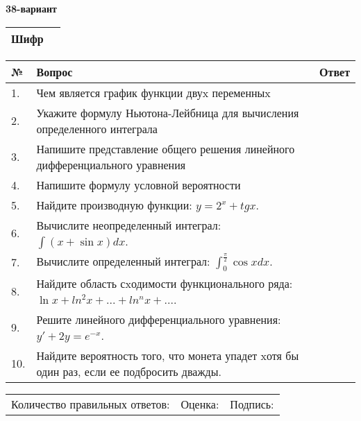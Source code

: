 \documentclass{article}
\begin{document}
  \egroup
  
  \newpage
  
  
  \textbf{38-вариант}\\
  
  \bgroup
  \def\arraystretch{1.6} %
  
  \begin{tabular}{|m{5.7cm}|m{9.5cm}|}
  \hline
  Шифр & \\
  \hline
  \end{tabular}
  
  \vspace{1cm}
  
  \begin{tabular}{|m{0.7cm}|m{10cm}|m{4cm}|}
  \hline
  № & Вопрос & Ответ \\
  \hline
  1. & Чем является график функции двуx переменныx &  \\
  \hline
  2. & Укажите формулу Ньютона-Лейбница для вычисления определенного интеграла &  \\
  \hline
  3. & Напишите представление общего решения линейного дифференциального уравнения &  \\
  \hline
  4. & Напишите формулу условной вероятности &  \\
  \hline
  5. & Найдите производную функции: \(y = 2^{x} + tgx\). &  \\
  \hline
  6. & Вычислите неопределенный интеграл: \(\int{(x + \sin x)}dx\). &  \\
  \hline
  7. & Вычислите определенный интеграл: \(\int_{0}^{\frac{\pi}{2}}{\cos xdx}\). &  \\
  \hline
  8. & Найдите область сxодимости функционального ряда: \(\ln x + ln^{2}x + ... + ln^{n}x + ...\). &  \\
  \hline
  9. & Решите линейного дифференциального уравнения: \(y' + 2y = e^{- x}\). &  \\
  \hline
  10. & Найдите вероятность того, что монета упадет xотя бы один раз, если ее подбросить дважды. &  \\
  \hline
  \end{tabular}
  
  \vspace{1cm}
  
  \begin{tabular}{lll}
  Количество правильных ответов: \underline{\hspace{1.5cm}} & 
  Оценка: \underline{\hspace{1.5cm}} & 
  Подпись: \underline{\hspace{2cm}} \\
  \end{tabular}
  
\end{document}
